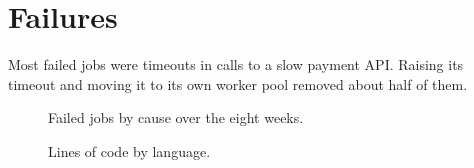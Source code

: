 \documentclass[11pt]{article}
\begin{document}
\section{Failures}

Most failed jobs were timeouts in calls to a slow payment API. Raising its timeout and moving it to its own worker pool removed about half of them.

\begin{figure}[htbp]
\centering
{}
\caption{Failed jobs by cause over the eight weeks.}
\end{figure}

\begin{figure}[htbp]
\centering
{}
\caption{Lines of code by language.}
\end{figure}
\end{document}
